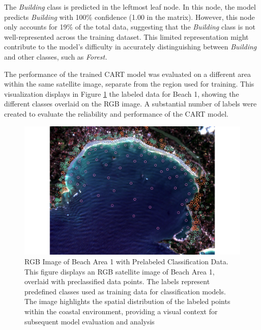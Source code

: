 \documentclass[a4paper,12pt]{article}
\begin{document}
The \textit{Building} class is predicted in the leftmost leaf node. In this node, the model predicts \textit{Building} with 100\% confidence (1.00 in the matrix). However, this node only accounts for 19\% of the total data, suggesting that the \textit{Building} class is not well-represented across the training dataset. This limited representation might contribute to the model's difficulty in accurately distinguishing between \textit{Building} and other classes, such as \textit{Forest.}

The performance of the trained CART model was evaluated on a different area within the same satellite image, separate from the region used for training. This visualization displays in Figure \ref{fig:Model labels} the labeled data for Beach 1, showing the different classes overlaid on the RGB image. A substantial number of labels were created to evaluate the reliability and performance of the CART model.
\begin{figure}[H]
    \centering
    \includegraphics[width=0.5\linewidth]{Model_Beach1/Beach1_labbels.png}
    \caption[RGB Image of Beach Area 1 with Prelabeled Classification Data]{RGB Image of Beach Area 1 with Prelabeled Classification Data. This figure displays an RGB satellite image of Beach Area 1, overlaid with preclassified data points. The labels represent predefined classes used as training data for classification models. The image highlights the spatial distribution of the labeled points within the coastal environment, providing a visual context for subsequent model evaluation and analysis}
    \label{fig:Model labels}
\end{figure}
\end{document}
